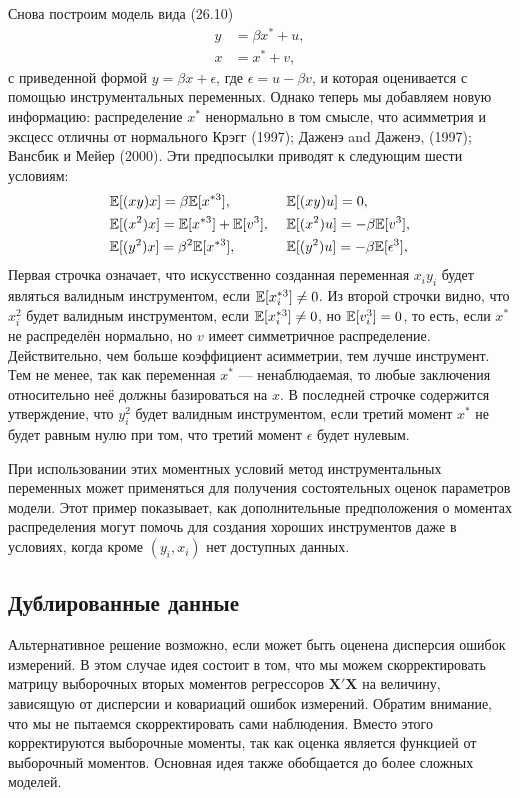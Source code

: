Снова построим модель вида (26.10)
\begin{align*}
y&=\beta x^* + u, \\
x&=x^*+v,
\end{align*}
с приведенной формой  $y=\beta x+ \epsilon$, где $\epsilon = u- \beta v$, и которая оценивается с помощью инструментальных переменных. Однако теперь мы добавляем новую информацию: распределение $x^*$ ненормально в том смысле, что асимметрия и эксцесс отличны от нормального Крэгг (1997); Даженэ and Даженэ, (1997); Вансбик и Мейер (2000). Эти предпосылки приводят к следующим шести условиям:
\begin{align*}
&\mathbb{E} [(xy)x]=\beta \mathbb{E} [x^{*3}], &\ &\mathbb{E} [(xy)u]=0, \\
&\mathbb{E} [(x^2)x]=\mathbb{E} [x^{*3}]+\mathbb{E} [v^3],&\ &\mathbb{E} [(x^2)u]=-\beta \mathbb{E} [v^3], \\
&\mathbb{E} [(y^2)x]=\beta^2 \mathbb{E} [x^{*3}],&\ &\mathbb{E} [(y^2)u]=-\beta \mathbb{E} [\epsilon^3],
\end{align*}
Первая строчка означает, что искусственно созданная переменная $x_i y_i$ будет являться валидным инструментом, если $\mathbb{E}[x^{*3}_i] \neq 0$.  Из второй строчки видно, что $x^2_i$ будет валидным инструментом, если  $\mathbb{E}[x^{*3}_i] \neq 0$, но  $\mathbb{E}[v^3_i] = 0$, то есть, если $x^*$ не распределён нормально, но $v$ имеет симметричное распределение. Действительно, чем больше коэффициент асимметрии, тем лучше инструмент. Тем не менее, так как переменная $x^*$ --- ненаблюдаемая, то любые заключения относительно неё должны базироваться на $x$. В последней строчке содержится утверждение, что $y_i^2$ будет валидным инструментом, если третий момент $x^*$ не будет равным нулю при том, что третий момент $\epsilon$ будет нулевым.

При использовании этих моментных условий метод инструментальных переменных может применяться для получения состоятельных оценок параметров модели. Этот пример показывает, как дополнительные предположения о моментах распределения могут помочь для создания хороших инструментов даже в условиях, когда кроме $(y_i, x_i)$ нет доступных данных.

\subsection{Дублированные данные} 

Альтернативное решение возможно, если может быть оценена дисперсия ошибок измерений. В этом случае идея состоит в том, что мы можем скорректировать матрицу выборочных вторых моментов регрессоров $\mathbf{X'X}$ на величину, зависящую от дисперсии и ковариаций ошибок измерений. Обратим внимание, что мы не пытаемся скорректировать сами наблюдения. Вместо этого корректируются выборочные моменты, так как оценка  является функцией от выборочный моментов. Основная идея также обобщается до более сложных моделей.

